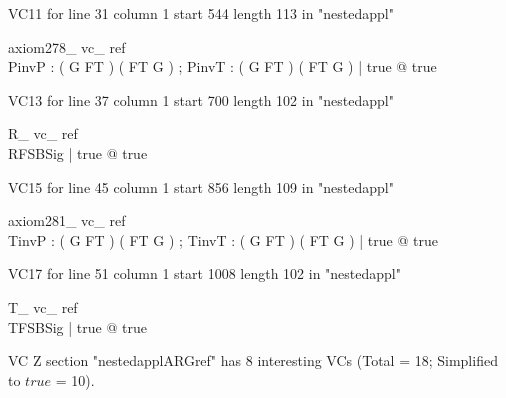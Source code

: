 \documentclass{article}
\begin{document}
VC11 for line 31 column 1 start 544 length 113 in "nestedappl"
\begin{theorem}{ axiom278\_ vc\_ ref}\\
 \exists PinvP : ( G \pfun FT ) \pfun ( FT \pfun G ) ; PinvT : ( G \pfun FT ) \fun ( FT \pfun G ) | true @ true \\

\end{theorem}

VC13 for line 37 column 1 start 700 length 102 in "nestedappl"
\begin{theorem}{ R\_ vc\_ ref}\\
 \exists RFSBSig | true @ true \\

\end{theorem}

VC15 for line 45 column 1 start 856 length 109 in "nestedappl"
\begin{theorem}{ axiom281\_ vc\_ ref}\\
 \exists TinvP : ( G \fun FT ) \pfun ( FT \fun G ) ; TinvT : ( G \fun FT ) \fun ( FT \fun G ) | true @ true \\

\end{theorem}

VC17 for line 51 column 1 start 1008 length 102 in "nestedappl"
\begin{theorem}{ T\_ vc\_ ref}\\
 \exists TFSBSig | true @ true \\

\end{theorem}



 VC Z section "nestedapplARGref" has $8$ interesting VCs (Total = 18; Simplified to $true$ = 10).



\end{document}
